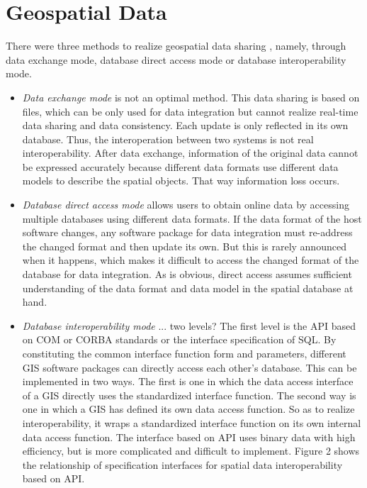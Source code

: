 \documentclass[12pt,a4paper]{report}
\newcommand{\term}{\textit}
\begin{document}
	\section{Geospatial Data}
	\label{sec:fed_geodata:geodata}

	There were three methods to realize geospatial data sharing \citep{Shi}, 
	namely, through data exchange mode, database direct access mode or database 
	interoperability mode. 
	\begin{itemize} 
		\item \term{Data exchange mode} is not an optimal method. This data 
		sharing is based on files, which can be only used for data integration 
		but cannot realize real-time data sharing and data consistency. Each 
		update is only reflected in its own database. Thus, the interoperation 
		between two systems is not real interoperability. After data exchange, 
		information of the original data cannot be expressed accurately because 
		different data formats use different data models to describe the 
		spatial objects. That way information loss occurs.
		\item \term{Database direct access mode} allows users to obtain online 
		data by accessing multiple databases using different data formats. If 
		the data format of the host software changes, any software package for 
		data integration must re-address the changed format and then update 
		its own. But this is rarely announced when it happens, which makes it 
		difficult to access the changed format of the database for data 
		integration. As is obvious, direct access assumes sufficient 
		understanding of the data format and data model in the spatial database 
		at hand.
		\item \term{Database interoperability mode} ... two levels?
		The  first  level  is  the  API  based  on  COM  or  CORBA standards  or  the  interface  specification  of  SQL.  By constituting  the  common  interface  function  form  and parameters,   different   GIS   software   packages   can directly  access  each  other’s  database.  This  can  be implemented in two ways. The first is one in which the data   access   interface   of   a   GIS   directly   uses   the standardized interface function. The second way is one in which a GIS has defined its own data access function. So as to realize interoperability, it wraps a standardized interface  function  on  its  own  internal  data  access function. The  interface based  on API  uses  binary  data with  high  efficiency,  but  is  more  complicated  and difficult to implement. Figure 2 shows the relationship of specification interfaces for spatial data interoperability based on API. 


\end{itemize}
\end{document}
